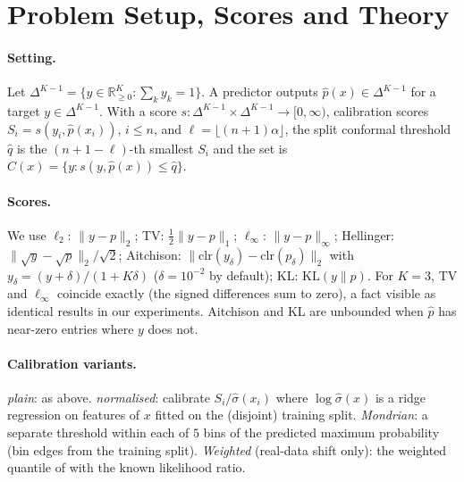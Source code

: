 \section{Problem Setup, Scores and Theory}\label{sec:method}
\paragraph{Setting.} Let $\Delta^{K-1}=\{y\in\mathbb R^K_{\ge0}:\sum_k y_k=1\}$. A predictor outputs $\hat p(x)\in\Delta^{K-1}$ for a target $y\in\Delta^{K-1}$. With a score $s:\Delta^{K-1}\times\Delta^{K-1}\to[0,\infty)$, calibration scores $S_i=s(y_i,\hat p(x_i))$, $i\le n$, and $\ell=\lfloor(n+1)\alpha\rfloor$, the split conformal threshold $\hat q$ is the $(n+1-\ell)$-th smallest $S_i$ and the set is $C(x)=\{y:s(y,\hat p(x))\le\hat q\}$.
\paragraph{Scores.} We use $\ell_2$: $\|y-p\|_2$; TV: $\tfrac12\|y-p\|_1$; $\ell_\infty$: $\|y-p\|_\infty$; Hellinger: $\|\sqrt y-\sqrt p\|_2/\sqrt2$; Aitchison: $\|\mathrm{clr}(y_\delta)-\mathrm{clr}(p_\delta)\|_2$ with $y_\delta=(y+\delta)/(1+K\delta)$ ($\delta=10^{-2}$ by default); KL: $\mathrm{KL}(y\|p)$. For $K=3$, TV and $\ell_\infty$ coincide exactly (the signed differences sum to zero), a fact visible as identical results in our experiments. Aitchison and KL are unbounded when $\hat p$ has near-zero entries where $y$ does not.
\paragraph{Calibration variants.} \emph{plain}: as above. \emph{normalised}: calibrate $S_i/\hat\sigma(x_i)$ where $\log\hat\sigma(x)$ is a ridge regression on features of $x$ fitted on the (disjoint) training split. \emph{Mondrian}: a separate threshold within each of $5$ bins of the predicted maximum probability (bin edges from the training split). \emph{Weighted} (real-data shift only): the weighted quantile of \citet{tibshirani2019covariate} with the known likelihood ratio.

